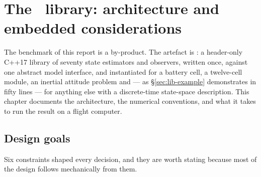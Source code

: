 \chapter{The \estkit\ library: architecture and embedded considerations}
\label{ch:library}

The benchmark of this report is a by-product. The artefact is \estkit: a header-only C++17 library
of seventy state estimators and observers, written once, against one abstract model interface, and
instantiated for a battery cell, a twelve-cell module, an inertial attitude problem and --- as
\S\ref{sec:lib-example} demonstrates in fifty lines --- for anything else with a discrete-time
state-space description. This chapter documents the architecture, the numerical conventions, and
what it takes to run the result on a flight computer.

\section{Design goals}

Six constraints shaped every decision, and they are worth stating because most of the design
follows mechanically from them.

